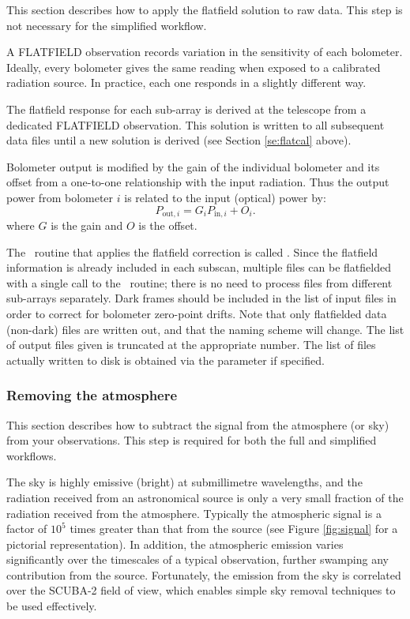 \documentclass[oneside,11pt]{starlink}
\begin{document}
This section describes how to apply the flatfield solution to raw
data. This step is not necessary for the simplified workflow.

A FLATFIELD observation records variation in the sensitivity of each
bolometer. Ideally, every bolometer gives the same reading when
exposed to a calibrated radiation source. In practice, each one
responds in a slightly different way.

The flatfield response for each sub-array is derived at the telescope
from a dedicated FLATFIELD observation. This solution is written to
all subsequent data files until a new solution is derived (see Section
\ref{se:flatcal} above).

Bolometer output is modified by the gain of the individual bolometer
and its offset from a one-to-one relationship with the input
radiation. Thus the output power from bolometer $i$ is related to the
input (optical) power by:
\begin{equation}
P_{{\textrm{out}},i} = G_i P_{{\textrm{in}},i} + O_i.
\end{equation}
where $G$ is the gain and $O$ is the offset.

The \SMURF\ routine that applies the flatfield correction is called
\flatfield. Since the flatfield information is already included in
each subscan, multiple files can be flatfielded with a single call to
the \flatfield\ routine; there is no need to process files from
different sub-arrays separately. Dark frames should be included in the
list of input files in order to correct for bolometer zero-point
drifts. Note that only flatfielded data (non-dark) files are written
out, and that the naming scheme will change. The list of output files
given is truncated at the appropriate number. The list of files
actually written to disk is obtained via the 
parameter if specified.

\subsubsection{Removing the atmosphere\label{se:skysub}}

This section describes how to subtract the signal from the atmosphere
(or sky) from your observations. This step is required for both the
full and simplified workflows.

The sky is highly emissive (bright) at submillimetre
wavelengths\cite{archibald}, and the radiation received from an
astronomical source is only a very small fraction of the radiation
received from the atmosphere. Typically the atmospheric signal is a
factor of $10^5$ times greater than that from the source (see Figure
\ref{fig:signal} for a pictorial representation). In addition, the
atmospheric emission varies significantly over the timescales of a
typical observation, further swamping any contribution from the
source. Fortunately, the emission from the sky is correlated over the
SCUBA-2 field of view, which enables simple sky removal techniques to
be used effectively\cite{archibald,sc2ana002}.
\end{document}
